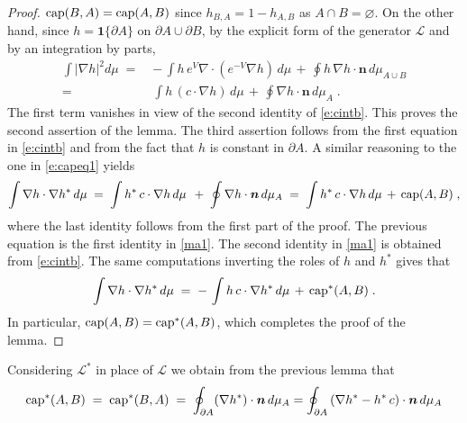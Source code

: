 \documentclass[reqno]{amsart}
\newcounter{as}[section]
\newcommand{\mc}[1]{{\mathcal #1}}
\newcommand{\bs}[1]{{\boldsymbol #1}}
\newcommand{\<}{\langle}
\renewcommand{\>}{\rangle}
\renewcommand{\Cap}{{\rm cap}}
\begin{document}
\begin{proof}
$\Cap(B,A)=\Cap(A,B)$ since $h_{B,A}=1-h_{A,B}$ as $A\cap
B=\varnothing$. On the other hand, since $h=\mathbf{1}\{\partial A\}$ on $\partial A
\cup \partial B$, by the
explicit form of the generator $\mc  L$ and by an integration by parts,
\begin{equation}
\label{e:capeq1}
\begin{aligned}
\int |\nabla h|^2 d\mu  \;=\;
& -\, \int h\, e^V\nabla \cdot \left(e^{-V} \nabla h\right)\, d\mu
\,+\, \oint h\, \nabla h\cdot\bs n\, d\mu_{A\cup B}
\\
=\; &  \int h\, (c \cdot \nabla h) \, d\mu
\,+\, \oint \nabla h\cdot\bs n  \,  d\mu_{A} \;.
\end{aligned}
\end{equation}
The first term vanishes in view of the second identity of
\eqref{e:cintb}. This proves the second assertion of the lemma.
The third assertion follows from the first equation in \eqref{e:cintb}
and from the fact that $h$ is constant in $\partial A$.
A similar reasoning to the one  in \eqref{e:capeq1} yields
\begin{equation*}
\int \nabla h \cdot \nabla h^* \, d\mu \;=\;
\int h^*\, c\cdot \nabla h \, d\mu\, \;+\;
\oint  \nabla h\cdot\bs n \, d\mu_{A}
\;=\; \int  h^*\,c\cdot \nabla h \, d\mu \, +\, \Cap(A,B)\;,
\end{equation*}
where the last identity follows from the first part of the proof.  The
previous equation is the first identity in \eqref{ma1}. The second
identity in \eqref{ma1} is obtained from \eqref{e:cintb}. The same
computations inverting the roles of $h$ and $h^*$ gives that
\begin{equation*}
\int \nabla h \cdot \nabla h^* \, d\mu \;=\;
 -\, \int  h\,c\cdot \nabla h^* \, d\mu \, +\, \Cap^*(A,B)\;.
\end{equation*}
In particular, $\Cap(A,B)=\Cap^*(A,B)$, which completes the proof of
the lemma.
\end{proof}
Considering $\mc L^*$ in place of $\mc L$ we obtain from the previous
lemma that
\begin{equation}
\label{ma02}
\Cap^*(A,B) \;=\; \Cap^*(B,A) \;=\;
\oint_{\partial A} (\nabla h^* )\cdot \bs n \,d\mu_A
=\oint_{\partial A} \left(\nabla h^* - h^*\, c\right)\cdot \bs n \,d\mu_A
\end{equation}
\end{document}
